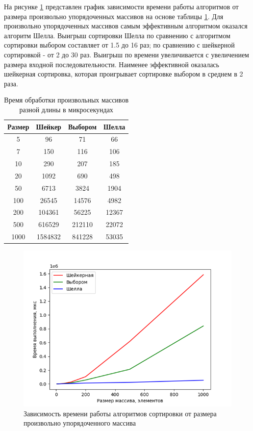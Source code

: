 \documentclass[a4paper,oneside,14pt]{extreport}
\begin{document}
На рисунке \ref{fig:random_arrays} представлен график зависимости времени работы алгоритмов от размера произвольно упорядоченных массивов на основе таблицы \ref{tab:rand_time}. Для произвольно упорядоченных массивов самым эффективным алгоритмом оказался алгоритм Шелла. Выигрыш сортировки Шелла по сравнению с алгоритмом сортировки выбором составляет от 1.5 до 16 раз; по сравнению с шейкерной сортировкой - от 2 до 30 раз. Выигрыш по времени увеличивается с увеличением размера входной последовательности. Наименее эффективной оказалась шейкерная сортировка, которая проигрывает сортировке выбором в среднем в 2 раза. 
\begin{table}[H]
	\begin{center}
		\captionsetup{justification=raggedleft, singlelinecheck=false}
		\caption{\label{tab:rand_time} Время обработки произвольных массивов разной длины в микросекундах}
		\begin{tabular}{|c c c c|} 
			\hline
			Размер&Шейкер&Выбором&Шелла\\ [0.5ex]
			\hline
			5 &  96 &  71 &  66\\ 
			\hline
			7 &  150 &  116 &  106\\ 
			\hline
			10 &  290 &  207 &  185\\ 
			\hline
			20 &  1092 &  690 &  498\\ 
			\hline
			50 &  6713 &  3824 &  1904\\ 
			\hline
			100 &  26545 &  14576 &  4982\\ 
			\hline
			200 &  104361 &  56225 &  12367\\ 
			\hline
			500 &  616529 &  212110 &  22072\\ 
			\hline
			1000 &  1584832 &  841228 &  53035\\ 
			\hline
		\end{tabular}
	\end{center}
\end{table}

\begin{figure}[H]
	\centering
	\includegraphics[width=0.9\linewidth]{images/rand_arrays}
	\caption{Зависимость времени работы алгоритмов сортировки от размера произвольно упорядоченного массива}
	\label{fig:random_arrays}
\end{figure}
\end{document}
